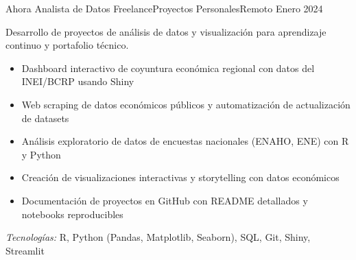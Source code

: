 \experience
{Ahora} {Analista de Datos Freelance}{Proyectos Personales}{Remoto}
{Enero 2024} {
	Desarrollo de proyectos de análisis de datos y visualización para aprendizaje continuo y portafolio técnico.
	\begin{itemize}
		\item Dashboard interactivo de coyuntura económica regional con datos del INEI/BCRP usando Shiny
		\item Web scraping de datos económicos públicos y automatización de actualización de datasets
		\item Análisis exploratorio de datos de encuestas nacionales (ENAHO, ENE) con R y Python
		\item Creación de visualizaciones interactivas y storytelling con datos económicos
		\item Documentación de proyectos en GitHub con README detallados y notebooks reproducibles
	\end{itemize}
}
{\footnotesize{\emph{Tecnologías:} R, Python (Pandas, Matplotlib, Seaborn), SQL, Git, Shiny, Streamlit}}
